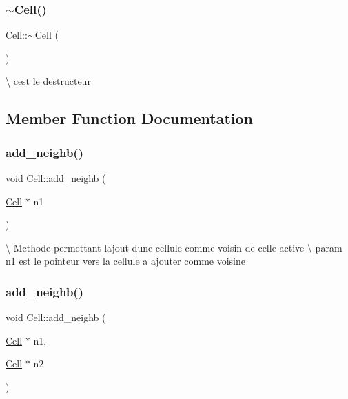 \subsubsection{\texorpdfstring{$\sim$\+Cell()}{~Cell()}}
{\footnotesize\ttfamily Cell\+::$\sim$\+Cell (\begin{DoxyParamCaption}{ }\end{DoxyParamCaption})}

\textbackslash{} c\textquotesingle{}est le destructeur

\subsection{Member Function Documentation}
\mbox{\label{class_cell_af74ee3d2e1d987c54f00f0edace4f5ab}} 
\subsubsection{\texorpdfstring{add\+\_\+neighb()}{add\_neighb()}\hspace{0.1cm}{\footnotesize\ttfamily [1/3]}}
{\footnotesize\ttfamily void Cell\+::add\+\_\+neighb (\begin{DoxyParamCaption}\item[{\hyperlink{class_cell}{Cell} $\ast$}]{n1 }\end{DoxyParamCaption})}

\textbackslash{} Methode permettant l\textquotesingle{}ajout d\textquotesingle{}une cellule comme voisin de celle active \textbackslash{} param n1 est le pointeur vers la cellule a ajouter comme voisine\mbox{\label{class_cell_a81f2432f9fbe040ba4f778726f72f50c}} 
\subsubsection{\texorpdfstring{add\+\_\+neighb()}{add\_neighb()}\hspace{0.1cm}{\footnotesize\ttfamily [2/3]}}
{\footnotesize\ttfamily void Cell\+::add\+\_\+neighb (\begin{DoxyParamCaption}\item[{\hyperlink{class_cell}{Cell} $\ast$}]{n1,  }\item[{\hyperlink{class_cell}{Cell} $\ast$}]{n2 }\end{DoxyParamCaption})}

